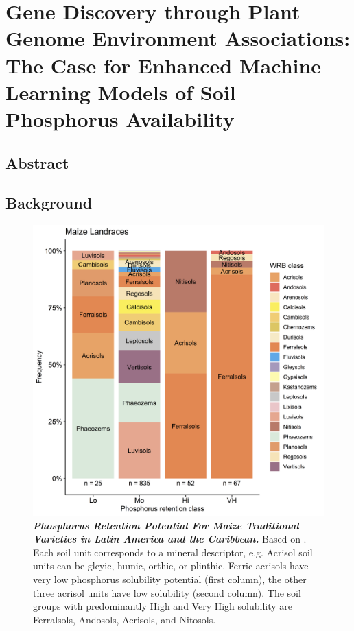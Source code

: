 \chapter{Gene Discovery through Plant Genome Environment Associations:
The Case for Enhanced Machine Learning Models of Soil Phosphorus Availability}
\label{chap-three}

\newrefsection

\section{Abstract}

\section{Background}

 
\begin{figure}[!ht]
\centering
\includegraphics[width=\linewidth]{Chapter-2/figs/WRB_Pret.png}
\caption[Phosphorus Retention Potential For Maize Traditional Varieties in Latin America and the Caribbean]{\textbf{\textit{Phosphorus Retention Potential For Maize Traditional Varieties in Latin America and the Caribbean.}}
Based on \citep{batjes2011}.  Each soil unit corresponds to a mineral descriptor, e.g. Acrisol soil units can be gleyic, humic, orthic, or plinthic. Ferric acrisols have very low phosphorus solubility potential (first column), the other three acrisol units have low solubility (second column). The soil groups with predominantly High and Very High solubility are Ferralsols, Andosols, Acrisols, and Nitosols.}
\label{fig::WRB_Pret}
\end{figure}
\clearpage

